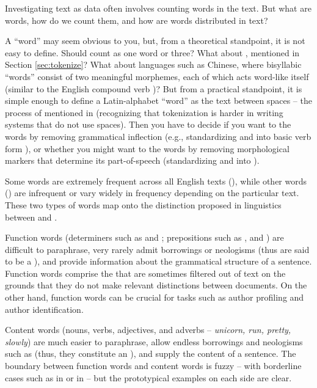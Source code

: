 Investigating text as data often involves counting words in the text.
But what are words, how do we count them, and how are words
distributed in text?

A ``word'' may seem obvious to you, but, from a theoretical
standpoint, it is not easy to define.  Should 
count as one word or three?  What about , mentioned in Section \ref{sec:tokenize}? What about languages such as Chinese,
where bisyllabic ``words'' consist of two meaningful morphemes, each
of which acts word-like itself (similar to the English compound verb
)?  But from a practical standpoint, it is simple
enough to define a Latin-alphabet ``word'' as the text between spaces
-- the process of  mentioned in  (recognizing that tokenization is harder in writing systems that do not use spaces).
Then you have to decide if you want to  the words
by removing grammatical inflection (e.g., standardizing
 and  into basic verb form ), or whether you might want to  the words by removing morphological markers that determine its part-of-speech (standardizing  and  into ).


Some words are extremely frequent across all English texts (), while other words () are
infrequent or vary widely in frequency depending on the particular
text.  These two types of words map onto the distinction proposed in
linguistics between  and .

Function words (determiners such as  and
; prepositions such as , and
) are difficult to paraphrase, very rarely  admit 
borrowings or neologisms (thus are said to be a ),
and provide information about the grammatical structure of a sentence.
Function words comprise the  that are sometimes
filtered out of text on the grounds that they do not make relevant
distinctions between documents.  On the other hand, function words can
be crucial for tasks such as author profiling and author
identification.

Content words (nouns, verbs, adjectives, and adverbs -- \textit{unicorn, run, pretty, slowly}) are much easier
to paraphrase, allow endless borrowings and neologisms such as  (thus, they constitute an
), and supply the content of a sentence.  The
boundary between function words and content words is fuzzy -- with
borderline cases such as  in  or
 in  -- but the prototypical
examples on each side are clear.

